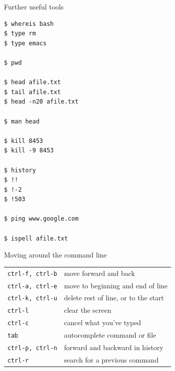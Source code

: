 \documentclass[12pt,t]{beamer}
\begin{document}
\begin{frame}[fragile]{Further useful tools}

\vspace{-12pt}

\begin{semiverbatim}
\begin{lstlisting}
$ whereis bash
$ type rm
$ type emacs

$ pwd

$ head afile.txt
$ tail afile.txt
$ head -n20 afile.txt

$ man head

$ kill 8453
$ kill -9 8453

$ history
$ !!
$ !-2
$ !503

$ ping www.google.com

$ ispell afile.txt
\end{lstlisting}
\end{semiverbatim}


\end{frame}


\begin{frame}[c]{Moving around the command line}

\renewcommand{\arraystretch}{1.3}
\begin{tabular}{ll} 
{\tt ctrl-f, ctrl-b} & \color{lolight} move forward and back \\
{\tt ctrl-a, ctrl-e} & \color{lolight}  move to beginning and end of line \\
{\tt ctrl-k, ctrl-u} & \color{lolight}  delete rest of line, or to the start \\
{\tt ctrl-l} & \color{lolight}  clear the screen \\
{\tt ctrl-c} & \color{lolight}  cancel what you've typed \\
{\tt tab} & \color{lolight}  autocomplete command or file \\
{\tt ctrl-p, ctrl-n} & \color{lolight}  forward and backward in history \\
{\tt ctrl-r} & \color{lolight}  search for a previous command
\end{tabular}

\end{frame}
\end{document}

